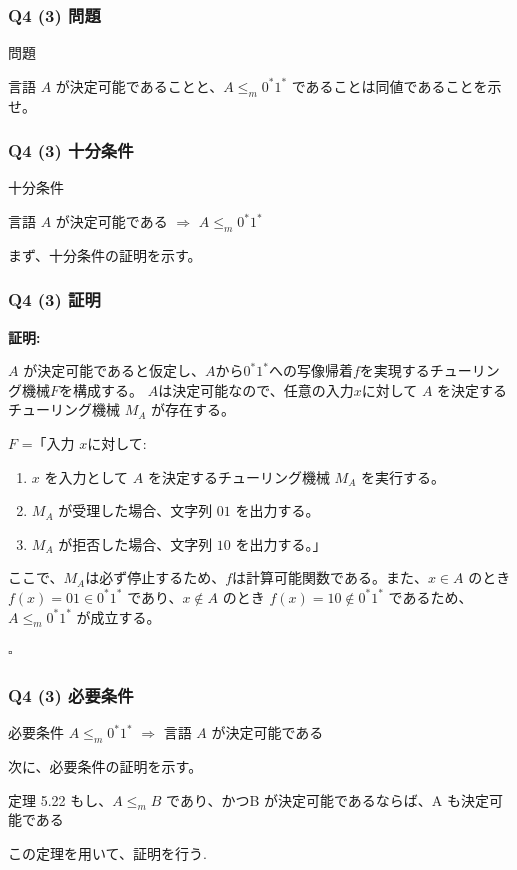 \begin{frame}[fragile]
\frametitle{Q4 (3) 問題}

\begin{alertblock}{問題}

言語 $A$ が決定可能であることと、$A \leq_m 0^*1^*$ であることは同値であることを示せ。

\end{alertblock}


\end{frame}


\begin{frame}[fragile]
\frametitle{Q4 (3) 十分条件}

\begin{alertblock}{十分条件}

言語 $A$ が決定可能である $\Longrightarrow$  $A \leq_m 0^*1^*$

\end{alertblock}

まず、十分条件の証明を示す。

\end{frame}

\begin{frame}[fragile]
\frametitle{Q4 (3) 証明}

\textbf{証明:}

$A$ が決定可能であると仮定し、$A$から$0^*1^*$への写像帰着$f$を実現するチューリング機械$F$を構成する。
$A$は決定可能なので、任意の入力$x$に対して $A$ を決定するチューリング機械 $M_A$ が存在する。

$F$ =「入力 $x$に対して:
\begin{enumerate}
	\item $x$ を入力として $A$ を決定するチューリング機械 $M_A$ を実行する。
	\item $M_A$ が受理した場合、文字列 $01$ を出力する。
	\item $M_A$ が拒否した場合、文字列 $10$ を出力する。」
\end{enumerate}

ここで、$M_A$は必ず停止するため、$f$は計算可能関数である。また、$x \in A$ のとき $f(x) = 01 \in 0^*1^*$ であり、$x \notin A$ のとき $f(x) = 10 \notin 0^*1^*$ であるため、$A \leq_m 0^*1^*$ が成立する。

\hfill $\square$



\end{frame}

\begin{frame}[fragile]
\frametitle{Q4 (3) 必要条件}

\begin{alertblock}{必要条件}
$A \leq_m 0^*1^*$ $\Longrightarrow$ 言語 $A$ が決定可能である
\end{alertblock}
次に、必要条件の証明を示す。

\begin{alertblock}{定理 5.22}
もし、$A \leq_m B$ であり、かつB が決定可能であるならば、A も決定可能である
\end{alertblock}

この定理を用いて、証明を行う.


\end{frame}


